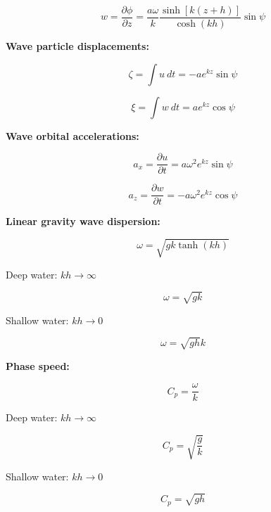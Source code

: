 \documentclass[12pt]{article}
\numberwithin{equation}{section}
\numberwithin{figure}{section}
\numberwithin{table}{section}
\begin{document}
\begin{equation}
  w = \frac{\partial \phi}{\partial z} = \frac{a \omega}{k} \frac{\sinh[k(z + h)]}{\cosh(kh)} \sin\psi
\end{equation}

\textbf{Wave particle displacements:}

\begin{equation}
  \zeta = \int u\ dt = - a e^{kz} \sin\psi
\end{equation}

\begin{equation}
  \xi = \int w\ dt = a e^{kz} \cos\psi
\end{equation}

\textbf{Wave orbital accelerations:}

\begin{equation}
  a_x = \frac{\partial u}{\partial t} = a \omega^2 e^{kz} \sin\psi
\end{equation}

\begin{equation}
  a_z = \frac{\partial w}{\partial t} = - a \omega^2 e^{kz} \cos\psi
\end{equation}

\textbf{Linear gravity wave dispersion:}

\begin{equation}
  \omega = \sqrt{g k \tanh(kh)}
\end{equation}

Deep water: $kh \to \infty$

\begin{equation}
  \omega = \sqrt{g k}
\end{equation}

Shallow water: $kh \to 0$

\begin{equation}
  \omega = \sqrt{gh} k
\end{equation}

\textbf{Phase speed:}

\begin{equation}
  C_p = \frac{\omega}{k}
\end{equation}

Deep water: $kh \to \infty$

\begin{equation}
  C_p = \sqrt{\frac{g}{k}}
\end{equation}

Shallow water: $kh \to 0$

\begin{equation}
  C_p = \sqrt{gh}
\end{equation}
\end{document}
